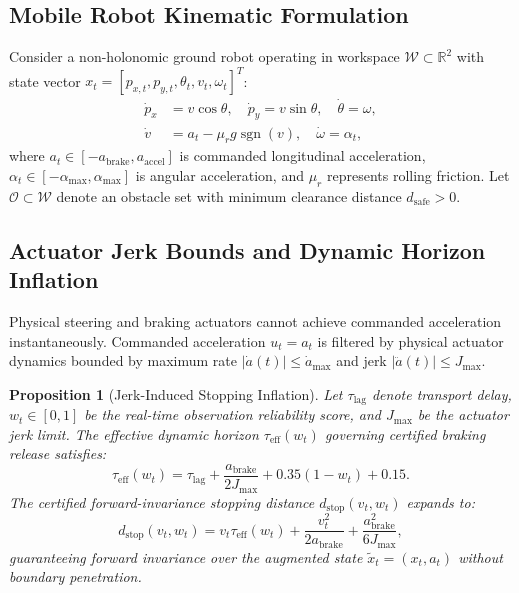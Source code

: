 \documentclass[conference]{IEEEtran}
\newtheorem{proposition}{Proposition}
\begin{document}
\subsection{Mobile Robot Kinematic Formulation}
Consider a non-holonomic ground robot operating in workspace $\mathcal{W} \subset \mathbb{R}^2$ with state vector $x_t = [p_{x,t}, p_{y,t}, \theta_t, v_t, \omega_t]^T$:
\begin{equation}
\begin{aligned}
\dot{p}_x &= v \cos\theta, \quad \dot{p}_y = v \sin\theta, \quad \dot{\theta} = \omega, \\
\dot{v} &= a_t - \mu_r g \operatorname{sgn}(v), \quad \dot{\omega} = \alpha_t,
\end{aligned}
\end{equation}
where $a_t \in [-a_{\mathrm{brake}}, a_{\mathrm{accel}}]$ is commanded longitudinal acceleration, $\alpha_t \in [-\alpha_{\max}, \alpha_{\max}]$ is angular acceleration, and $\mu_r$ represents rolling friction. Let $\mathcal{O} \subset \mathcal{W}$ denote an obstacle set with minimum clearance distance $d_{\mathrm{safe}} > 0$.

\subsection{Actuator Jerk Bounds and Dynamic Horizon Inflation}
Physical steering and braking actuators cannot achieve commanded acceleration instantaneously. Commanded acceleration $u_t = a_t$ is filtered by physical actuator dynamics bounded by maximum rate $|\dot{a}(t)| \le \dot{a}_{\max}$ and jerk $|\ddot{a}(t)| \le J_{\max}$.

\begin{proposition}[Jerk-Induced Stopping Inflation]
Let $\tau_{\mathrm{lag}}$ denote transport delay, $w_t \in [0, 1]$ be the real-time observation reliability score, and $J_{\max}$ be the actuator jerk limit. The effective dynamic horizon $\tau_{\mathrm{eff}}(w_t)$ governing certified braking release satisfies:
\begin{equation}
\tau_{\mathrm{eff}}(w_t) = \tau_{\mathrm{lag}} + \frac{a_{\mathrm{brake}}}{2 J_{\max}} + 0.35(1 - w_t) + 0.15.
\end{equation}
The certified forward-invariance stopping distance $d_{\mathrm{stop}}(v_t, w_t)$ expands to:
\begin{equation}
d_{\mathrm{stop}}(v_t, w_t) = v_t \tau_{\mathrm{eff}}(w_t) + \frac{v_t^2}{2 a_{\mathrm{brake}}} + \frac{a_{\mathrm{brake}}^2}{6 J_{\max}},
\end{equation}
guaranteeing forward invariance over the augmented state $\tilde{x}_t = (x_t, a_t)$ without boundary penetration.
\end{proposition}
\end{document}
